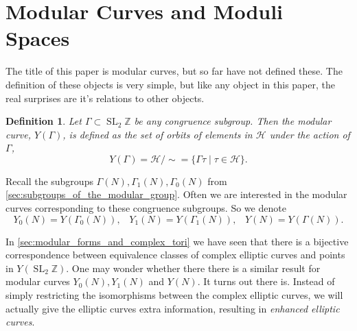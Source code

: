 \documentclass[titlepage,a4paper]{article}
\theoremstyle{theoremdd}
\theoremstyle{definitiondd}
\newtheorem{definition}[theorem]{Definition}
\theoremstyle{remarkdd}
\newcommand{\Z}{\mathbb{Z}}
\DeclareMathOperator{\SL}{SL}
\begin{document}
\section{Modular Curves and Moduli Spaces} \label{sec:modular_curves_and_moduli_spaces}
The title of this paper is modular curves, but so far have not defined these. 
The definition of these objects is very simple, but like any object in this paper, the real surprises are it's relations to other objects. 
\begin{definition}
	Let $\Gamma \subset \SL_2\Z$ be any congruence subgroup. Then the \emph{modular curve}, $Y(\Gamma)$, is defined as the set of orbits of elements in  $\mathcal{H} $ under  the action of $\Gamma$, \[
		Y(\Gamma) = \mathcal{H} / \sim = \{\Gamma \tau \;|\; \tau \in \mathcal{H} \} 
	.\] 
\end{definition}
Recall the subgroups $\Gamma(N), \Gamma_1(N), \Gamma_0(N)$ from \cref{sec:subgroups_of_the_modular_group}. 
Often we are interested in the modular curves corresponding to these congruence subgroups. So we denote \[
	Y_0(N) = Y(\Gamma_0(N)),\;\;\; Y_1(N) = Y(\Gamma_1(N)),\;\;\; Y(N) = Y(\Gamma(N))
.\]  
 
In \cref{sec:modular_forms_and_complex_tori} we have seen that there is a bijective correspondence between equivalence classes of complex elliptic curves and points in $Y (\SL_2\Z)$. 
One may wonder whether there there is a similar result for modular curves $Y_0(N),Y_1(N)$ and $Y(N)$.
It turns out there is. 
Instead of simply restricting the isomorphisms between the complex elliptic curves, we will actually give the elliptic curves extra information, resulting in \emph{enhanced elliptic curves}. 
\end{document}
